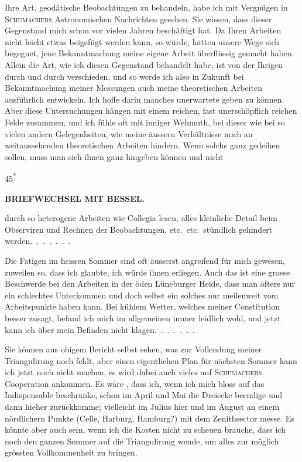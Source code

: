 \par\noindent\hspace*{\parindent}Ihre Art, geodätische Beobachtungen zu behandeln, habe ich mit Vergnügen in \textsc{Schumachers} Astronomischen Nachrichten gesehen.
Sie wissen, dass dieser Gegenstand mich schon vor vielen Jahren beschäftigt hat.
Da Ihren Arbeiten nicht leicht etwas beigefügt werden kann, so würde, hätten unsere Wege sich begegnet, jene Bekanntmachung meine eigene Arbeit überflüssig gemacht haben.
Allein die Art, wie ich diesen Gegenstand behandelt habe, ist von der Ihrigen durch und durch verschieden, und so werde ich also in Zukunft bei Bekanntmachung meiner Messungen auch meine theoretischen Arbeiten ausführlich entwickeln.
Ich hoffe darin manches unerwartete geben zu können.
Aber diese Untersuchungen hängen mit einem reichen, fast unerschöpflich reichen Felde zusammen, und ich fühle oft mit inniger Wehmuth, bei dieser wie bei so vielen andern Gelegenheiten, wie meine äussern Verhältnisse mich an weitaussehenden theoretischen Arbeiten hindern.
Wenn solche ganz gedeihen sollen, muss man sich ihnen ganz hingeben können und nicht
\par\smallskip\noindent\hfill{\footnotesize45\textsuperscript{*}}\par
\clearpage
{}\hfill{\small\textbf{BRIEFWECHSEL MIT BESSEL.}}\par\medskip
\noindent durch so heterogene Arbeiten wie Collegia lesen, alles kleinliche Detail beim Observiren und Rechnen der Beobachtungen, etc.\ etc.\ stündlich gehindert werden.\ .\ .\ .\ .\ .\ .

\par\noindent\hspace*{\parindent}Die Fatigen im heissen Sommer sind oft äusserst angreifend für mich gewesen, zuweilen so, dass ich glaubte, ich würde ihnen erliegen.
Auch das ist eine grosse Beschwerde bei den Arbeiten in der öden Lüneburger Heide, dass man öfters nur ein schlechtes Unterkommen und doch selbst ein solches nur meilenweit vom Arbeitspunkte haben kann.
Bei kühlem Wetter, welches meiner Constitution besser zusagt, befand ich mich im allgemeinen immer leidlich wohl, und jetzt kann ich über mein Befinden nicht klagen.\ .\ .\ .\ .\ .\ .

\par\noindent\hspace*{\parindent}Sie können aus obigem Bericht selbst sehen, was zur Vollendung meiner Triangulirung noch fehlt, aber einen eigentlichen Plan für nächsten Sommer kann ich jetzt noch nicht machen, es wird dabei auch vieles auf \textsc{Schumachers} Cooperation ankommen.
Es wäre , dass ich, wenn ich mich bloss auf das Indispensable beschränke, schon im April und Mai die Dreiecke beendige und dann hieher zurückkomme; vielleicht im Julius hier und im August an einem nördlichern Punkte (Celle, Harburg, Hamburg?) mit dem Zenithsector messe.
Es könnte aber auch sein, wenn ich die Kosten nicht zu scheuen brauche, dass ich noch den ganzen Sommer auf die Triangulirung wende, um alles zur möglich grössten Vollkommenheit zu bringen.

